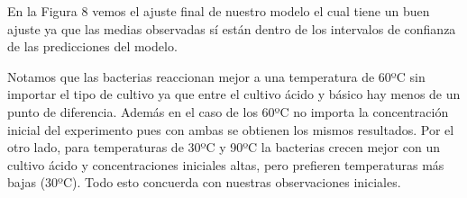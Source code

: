 \documentclass[10pt, spanish]{article}
\begin{document}
    
    En la Figura 8 vemos el ajuste final de nuestro modelo el cual tiene un
buen ajuste ya que las medias observadas sí están dentro de los
intervalos de confianza de las predicciones del modelo.

Notamos que las bacterias reaccionan mejor a una temperatura de 60ºC sin
importar el tipo de cultivo ya que entre el cultivo ácido y básico hay
menos de un punto de diferencia. Además en el caso de los 60ºC no
importa la concentración inicial del experimento pues con ambas se
obtienen los mismos resultados. Por el otro lado, para temperaturas de
30ºC y 90ºC la bacterias crecen mejor con un cultivo ácido y
concentraciones iniciales altas, pero prefieren temperaturas más bajas
(30ºC). Todo esto concuerda con nuestras observaciones iniciales.


    
    
    
\end{document}
